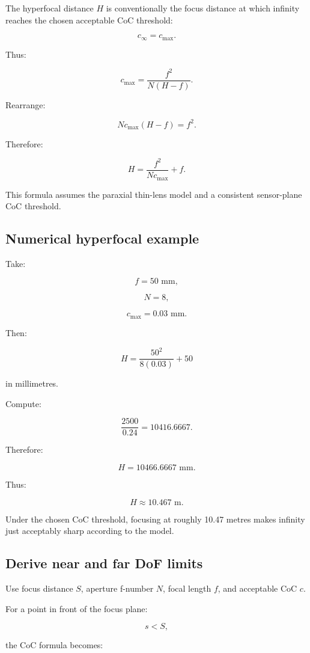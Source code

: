 The hyperfocal distance \(H\) is conventionally the focus distance at which infinity reaches the chosen acceptable CoC threshold:

\[ c_\infty=c_{\max}. \]

Thus:

\[ c_{\max} = \frac{f^2}{N(H-f)}. \]

Rearrange:

\[ N c_{\max}(H-f)=f^2. \]

Therefore:

\[ \boxed{ H=\frac{f^2}{N c_{\max}}+f. } \]

This formula assumes the paraxial thin-lens model and a consistent sensor-plane CoC threshold.

\subsection{Numerical hyperfocal example}\label{02-foundations-ii-ch036-numerical-hyperfocal-example}

Take:

\[ f=50\text{ mm}, \]

\[ N=8, \]

\[ c_{\max}=0.03\text{ mm}. \]

Then:

\[ H=\frac{50^2}{8(0.03)}+50 \]

in millimetres.

Compute:

\[ \frac{2500}{0.24}=10416.6667. \]

Therefore:

\[ H=10466.6667\text{ mm}. \]

Thus:

\[ \boxed{ H\approx10.467\text{ m}. } \]

Under the chosen CoC threshold, focusing at roughly 10.47 metres makes infinity just acceptably sharp according to the model.

\subsection{Derive near and far DoF limits}\label{02-foundations-ii-ch036-derive-near-and-far-dof-limits}

Use focus distance \(S\), aperture f-number \(N\), focal length \(f\), and acceptable CoC \(c\).

For a point in front of the focus plane:

\[ s<S, \]

the CoC formula becomes:

